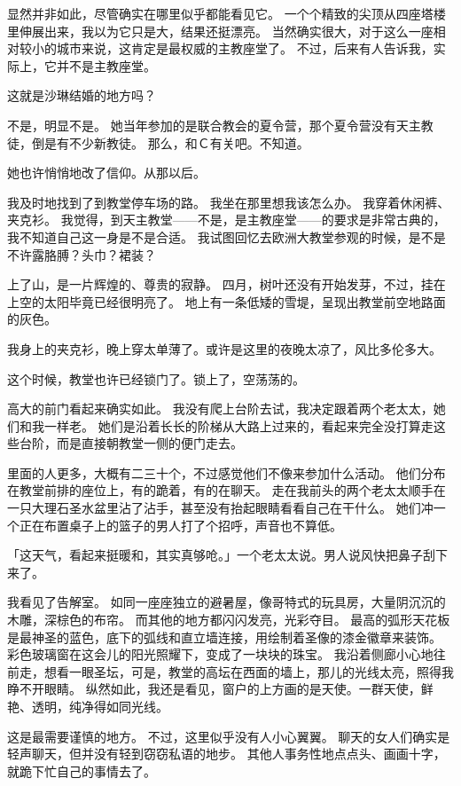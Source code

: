\documentclass[UTF8]{ctexart}
\begin{document}
显然并非如此，尽管确实在哪里似乎都能看见它。
一个个精致的尖顶从四座塔楼里伸展出来，我以为它只是大，结果还挺漂亮。
当然确实很大，对于这么一座相对较小的城市来说，这肯定是最权威的主教座堂了。
不过，后来有人告诉我，实际上，它并不是主教座堂。

这就是沙琳结婚的地方吗？

不是，明显不是。
她当年参加的是联合教会的夏令营，那个夏令营没有天主教徒，倒是有不少新教徒。
那么，和Ｃ有关吧。不知道。

她也许悄悄地改了信仰。从那以后。

我及时地找到了到教堂停车场的路。
我坐在那里想我该怎么办。
我穿着休闲裤、夹克衫。
我觉得，到天主教堂——不是，是主教座堂——的要求是非常古典的，我不知道自己这一身是不是合适。
我试图回忆去欧洲大教堂参观的时候，是不是不许露胳膊？头巾？裙装？

上了山，是一片辉煌的、尊贵的寂静。
四月，树叶还没有开始发芽，不过，挂在上空的太阳毕竟已经很明亮了。
地上有一条低矮的雪堤，呈现出教堂前空地路面的灰色。

我身上的夹克衫，晚上穿太单薄了。或许是这里的夜晚太凉了，风比多伦多大。

这个时候，教堂也许已经锁门了。锁上了，空荡荡的。

高大的前门看起来确实如此。
我没有爬上台阶去试，我决定跟着两个老太太，她们和我一样老。
她们是沿着长长的阶梯从大路上过来的，看起来完全没打算走这些台阶，而是直接朝教堂一侧的便门走去。

里面的人更多，大概有二三十个，不过感觉他们不像来参加什么活动。
他们分布在教堂前排的座位上，有的跪着，有的在聊天。
走在我前头的两个老太太顺手在一只大理石圣水盆里沾了沾手，甚至没有抬起眼睛看看自己在干什么。
她们冲一个正在布置桌子上的篮子的男人打了个招呼，声音也不算低。

「这天气，看起来挺暖和，其实真够呛。」一个老太太说。男人说风快把鼻子刮下来了。

我看见了告解室。
如同一座座独立的避暑屋，像哥特式的玩具房，大量阴沉沉的木雕，深棕色的布帘。
而其他的地方都闪闪发亮，光彩夺目。
最高的弧形天花板是最神圣的蓝色，底下的弧线和直立墙连接，用绘制着圣像的漆金徽章来装饰。
彩色玻璃窗在这会儿的阳光照耀下，变成了一块块的珠宝。
我沿着侧廊小心地往前走，想看一眼圣坛，可是，教堂的高坛在西面的墙上，那儿的光线太亮，照得我睁不开眼睛。
纵然如此，我还是看见，窗户的上方画的是天使。一群天使，鲜艳、透明，纯净得如同光线。

这是最需要谨慎的地方。
不过，这里似乎没有人小心翼翼。
聊天的女人们确实是轻声聊天，但并没有轻到窃窃私语的地步。
其他人事务性地点点头、画画十字，就跪下忙自己的事情去了。
\end{document}
